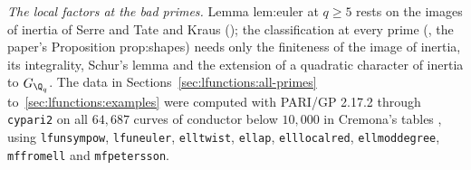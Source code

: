 \emph{The local factors at the bad primes.} Lemma lem:euler at $q\ge5$ rests on the images of inertia of Serre and Tate \cite{SerreTate68} and Kraus \cite{Kraus90}
(); the classification at every prime (, the paper's Proposition prop:shapes) needs only the finiteness of the
image of inertia, its integrality, Schur's lemma and the extension of a quadratic character of inertia to $G_{\Q_q}$. The data in Sections~\ref{sec:lfunctions:all-primes}
to~\ref{sec:lfunctions:examples} were computed with PARI/GP 2.17.2 \cite{PARI} through \texttt{cypari2} on all $64{,}687$ curves of conductor below $10{,}000$ in Cremona's tables
\cite{Cremona97,ecdata}, using \texttt{lfunsympow}, \texttt{lfuneuler}, \texttt{elltwist}, \texttt{ellap}, \texttt{elllocalred}, \texttt{ellmoddegree}, \texttt{mffromell} and \texttt{mfpetersson}.
